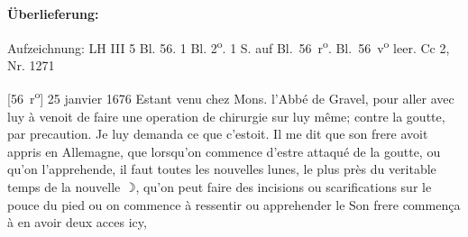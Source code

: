 \begin{ledgroupsized}[r]{120mm}%
\footnotesize%
\pstart%
\noindent\textbf{\"{U}berlieferung:}%
\pend%
\end{ledgroupsized}%
\begin{ledgroupsized}[r]{114mm}%
\footnotesize%
\pstart%
\parindent -6mm%
%
Aufzeichnung:
LH III 5 Bl. 56.
1 Bl. 2\textsuperscript{o}. 1 S. auf Bl.~56~r\textsuperscript{o}.
Bl.~56~v\textsuperscript{o} leer.%
\newline%
Cc 2, Nr. 1271%
\pend%
\end{ledgroupsized}%
%
%
\vspace*{8mm}%
\pstart %
\normalsize%
\noindent%
[56~r\textsuperscript{o}] 25 janvier 1676
\pend%
\count{}
\count{}
\count{}
\pstart%
\noindent%
Estant venu
chez Mons. l'Abb\'{e} de Gravel,\protect{}
pour aller avec luy \`{a} 
venoit de faire une operation de chirurgie sur luy m\^{e}me; contre la goutte, par precaution. Je luy demanda ce que c'estoit. Il me dit que son frere\protect{} avoit appris en Allemagne\protect{}, que lorsqu'on commence d'estre attaqu\'{e} de la goutte, ou qu'on l'apprehende, il faut toutes les nouvelles lunes, le plus pr\`{e}s du veritable temps de la nouvelle $\rightmoon$, qu'on peut faire des incisions ou scarifications sur le pouce du pied ou on commence \`{a} ressentir ou apprehender le
Son frere commen\c{c}a \`{a} en avoir deux acces icy, 
